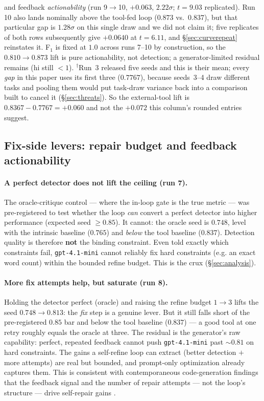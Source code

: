 \documentclass[11pt]{article}
\begin{document}
\begin{table}[h]
{and feedback \emph{actionability} (run 9$\to$10, $+0.063$, $2.22\sigma$; $t = 9.03$ replicated). Run 10 also lands nominally above
the tool-fed loop ($0.873$ vs.\ $0.837$), but that particular gap is
$1.28\sigma$ on this single draw and we did not claim it; five replicates of both rows
subsequently give $+0.0640$ at $t = 6.11$, and \S\ref{sec:curverepeat} reinstates it. F$_1$ is fixed at $1.0$ across runs
7--10 by construction, so the $0.810\!\to\!0.873$ lift is pure actionability, not detection;
a generator-limited residual remains (hi still $<1$). $^{\dagger}$Run~3 released five seeds and
this is their mean; every \emph{gap} in this paper uses its first three
($0.7767$), because seeds~3--4 draw different tasks and pooling them would put task-draw
variance back into a comparison built to cancel it (\S\ref{sec:threats}). So the external-tool
lift is $0.8367 - 0.7767 = +0.060$ and not the $+0.072$ this column's rounded entries suggest.}
\label{tab:curve}
\end{table}


\subsection{Fix-side levers: repair budget and feedback actionability}
\label{sec:fixside}

\paragraph{A perfect detector does not lift the ceiling (run 7).} The oracle-critique
control --- where the in-loop gate is the true metric --- was pre-registered to test
whether the loop \emph{can} convert a perfect detector into higher performance
(expected seed $\ge 0.85$). It cannot: the oracle seed is $0.748$, level with the
intrinsic baseline ($0.765$) and \emph{below} the tool baseline ($0.837$). Detection
quality is therefore \textbf{not} the binding constraint. Even told exactly which
constraints fail, \texttt{gpt-4.1-mini} cannot reliably fix hard constraints (e.g.
an exact word count) within the bounded refine budget. This is the crux
(\S\ref{sec:analysis}).

\paragraph{More fix attempts help, but saturate (run 8).} Holding the detector perfect
(oracle) and raising the refine budget $1 \to 3$ lifts the seed $0.748 \to 0.813$: the
\emph{fix} step is a genuine lever. But it still falls short of the pre-registered $0.85$
bar and below the tool baseline ($0.837$) --- a good tool at one retry roughly equals the
oracle at three. The residual is the generator's raw capability: perfect, repeated feedback
cannot push \texttt{gpt-4.1-mini} past $\sim\!0.81$ on hard constraints. The gains a
self-refine loop can extract (better detection $+$ more attempts) are real but bounded, and
prompt-only optimization already captures them. This is consistent with contemporaneous
code-generation findings that the feedback signal and the number of repair attempts --- not
the loop's structure --- drive self-repair gains \citep{feedbackoverform2026,howmanytries2026}.
\end{document}
